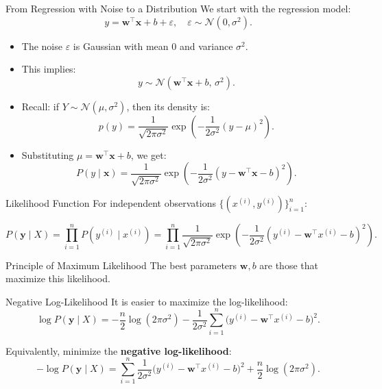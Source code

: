 \documentclass[../../main.tex]{subfiles}
\begin{document}
\begin{frame}{From Regression with Noise to a Distribution}
We start with the regression model:
\[
y = \mathbf{w}^\top \mathbf{x} + b + \varepsilon, 
\quad \varepsilon \sim \mathcal{N}(0, \sigma^2).
\]

\begin{itemize}
    \item The noise $\varepsilon$ is Gaussian with mean $0$ and variance $\sigma^2$.
    \item This implies:
    \[
    y \sim \mathcal{N}(\mathbf{w}^\top \mathbf{x} + b, \, \sigma^2).
    \]
    \item Recall: if $Y \sim \mathcal{N}(\mu, \sigma^2)$, then its density is:
    \[
    p(y) = \frac{1}{\sqrt{2\pi\sigma^2}} 
    \exp\left(-\frac{1}{2\sigma^2}(y - \mu)^2\right).
    \]
    \item Substituting $\mu = \mathbf{w}^\top \mathbf{x} + b$, we get:
    \[
    P(y \mid \mathbf{x}) 
    = \frac{1}{\sqrt{2\pi\sigma^2}}
    \exp\left( -\frac{1}{2\sigma^2}(y - \mathbf{w}^\top \mathbf{x} - b)^2 \right).
    \]
\end{itemize}
\end{frame}


\begin{frame}{Likelihood Function}
For independent observations $\{(x^{(i)}, y^{(i)})\}_{i=1}^n$:

\[
P(\mathbf{y} \mid X) = \prod_{i=1}^n P(y^{(i)} \mid x^{(i)})
= \prod_{i=1}^n \frac{1}{\sqrt{2\pi\sigma^2}}
\exp\left( - \frac{1}{2\sigma^2} (y^{(i)} - \mathbf{w}^\top x^{(i)} - b)^2 \right).
\]

\begin{block}{Principle of Maximum Likelihood}
The best parameters $\mathbf{w}, b$ are those that maximize this likelihood.
\end{block}
\end{frame}

\begin{frame}{Negative Log-Likelihood}
It is easier to maximize the log-likelihood:
\[
\log P(\mathbf{y} \mid X) 
= - \frac{n}{2} \log(2\pi\sigma^2) 
- \frac{1}{2\sigma^2} \sum_{i=1}^n \big(y^{(i)} - \mathbf{w}^\top x^{(i)} - b \big)^2.
\]

Equivalently, minimize the \textbf{negative log-likelihood}:
\[
- \log P(\mathbf{y} \mid X) 
= \sum_{i=1}^n \frac{1}{2\sigma^2} \big(y^{(i)} - \mathbf{w}^\top x^{(i)} - b \big)^2 
+ \frac{n}{2}\log(2\pi\sigma^2).
\]
\end{frame}
\end{document}
